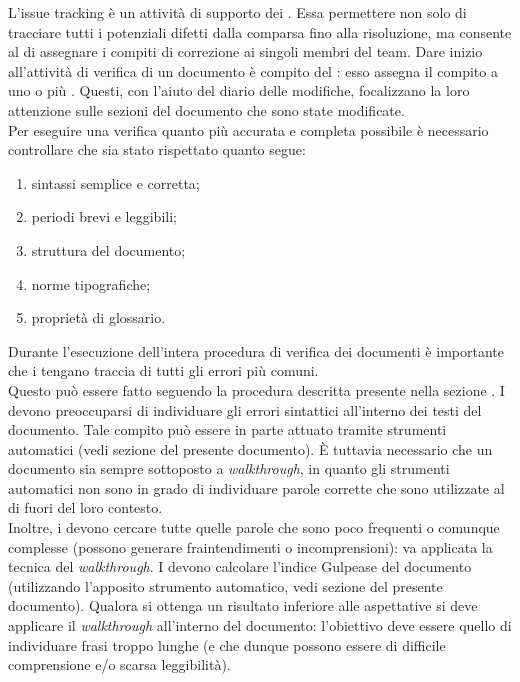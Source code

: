 			L'issue tracking è un attività di supporto dei . Essa permettere non solo di tracciare tutti i potenziali difetti dalla comparsa fino alla risoluzione, ma consente al  di assegnare i compiti di correzione ai singoli membri del team.
			Dare inizio all'attività di verifica di un documento è compito del : esso assegna il compito a uno o più . 
			Questi, con l'aiuto del diario delle modifiche, focalizzano la loro attenzione sulle sezioni del documento che sono state modificate.\\
			Per eseguire una verifica quanto più accurata e completa possibile è necessario controllare che sia stato rispettato quanto segue:
			\begin{enumerate}
				\item sintassi semplice e corretta;
				\item periodi brevi e leggibili;
				\item struttura del documento;
				\item norme tipografiche;
				\item proprietà di glossario.
			\end{enumerate}
			Durante l'esecuzione dell'intera procedura di verifica dei documenti è importante che i  tengano traccia di tutti 
			gli errori più comuni.\\ Questo può essere fatto seguendo la procedura descritta presente nella sezione .
				I  devono preoccuparsi di individuare gli errori sintattici all'interno dei testi del documento. Tale compito può 
				essere in parte attuato tramite strumenti automatici (vedi sezione  del presente documento). È tuttavia necessario che un documento sia sempre sottoposto a \textit{walkthrough}, in quanto gli strumenti automatici non sono in grado di individuare parole corrette che sono utilizzate al di fuori del loro contesto.\\
				Inoltre, i  devono cercare tutte quelle parole che sono poco frequenti o comunque complesse (possono generare fraintendimenti o incomprensioni): va applicata la tecnica del \textit{walkthrough}.
				I  devono calcolare l'indice Gulpease del documento (utilizzando l'apposito strumento automatico, vedi sezione 
				 del presente documento). Qualora si ottenga un risultato inferiore alle aspettative si deve applicare il \textit{walkthrough} all'interno del documento: l'obiettivo deve essere quello di individuare frasi troppo lunghe (e che dunque possono essere di difficile comprensione e/o scarsa leggibilità).
